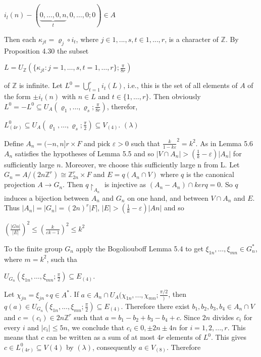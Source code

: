 \documentclass[12pt]{article}
\begin{document}
    $i_l (n) - (\underbrace{0, \dots, 0, n}_t, 0, \dots, 0; 0) \in A$


    Then each $κ_{jt} = \varrho_j \circ i_t$, where $j \in {1, . . . , s}, t \in {1, . . . , r}$, is a character of $\mathbb{Z}$. By Proposition 4.30 the subset


    $L = U_{\mathbb{Z}} (\{\kappa_{jt} : j = 1, \dots, s, t=1, \dots, r\}; \frac{\pi}{8r})$


of $\mathbb{Z}$ is infinite. Let $L^0 = \bigcup^r_{t=1} i_t (L)$, i.e., this is the set of all elements of $A$ of the form $\pm i_t (n)$ with $n \in L$ and 
$t \in \{1, \dots, r\}$. Then obviously $L^0 = -L^0 \subseteq U_A (\varrho_1, \dots, \varrho_s; \frac{\pi}{8r})$, therefor,


    $L^0_{(4r)} \subseteq U_A (\varrho_1, \dots, \varrho_s; \frac{\pi}{2}) \subseteq V_{(4)}$.  $(\lambda)$


    
    Define $A_n = (-n, n]r \times F$ and pick $\varepsilon > 0$ such that $\frac{k}{1-k\varepsilon}^2= k^2$. As in Lemma 5.6 $A_n$ satisfies the
hypotheses of Lemma 5.5 and so $|V \cap A_n| > (\frac{1}{k} - \varepsilon)|A_n|$ for sufficiently large $n$. Moreover, we choose this
sufficiently large n from L. Let $G_n = A/(2n \mathbb{Z}^r) \cong \mathbb{Z}^r_{2n} \times F$ and $E = q(A_n \cap V )$ where $q$ is the canonical
projection $A \to G_n$. Then $q \upharpoonright_{A_n}$ is injective as $(A_n - A_n) \cap ker q = 0$. So $q$ induces a bijection between $A_n$ and
$G_n$ on one hand, and between $V \cap A_n$ and $E$. Thus $|A_n| = |G_n| = (2n)^r |F|$, $|E| > (\frac{1}{k} - \varepsilon)|An|$ and so


    $(\frac{|Gn|}{|E|})^2 \leq (\frac{k}{\varepsilon k - 1})^2 \leq k^2$


    
    To the finite group $G_n$ apply the Bogoliouboff Lemma 5.4 to get $\xi_{1n}, \dots , \xi_{mn} \in G^*_n$, where $m = k^2$, such tha


    $U_{G_n} (\xi_{1n}, \dots, \xi_{mn}; \frac{\pi}{2}) \subseteq E_{(4)}$.

    
Let $\chi_{jn} = \xi_{jn} \circ q \in A^*$. If $a \in A_n \cap U_A(\chi_{1n}, . . . , \chi_{mn}; \frac{\pi/2})$, then $q(a) \in U_{G_n}(\xi_{1n}, . . . , \xi_{mn}; \frac{\pi}{2}) \subseteq E_{(4)}$. Therefore
there exist $b_1, b_2, b_3, b_4 \in A_n \cap V$ and $c = (c_i) \in 2n\mathbb{Z}^r$ such that $a = b_1 - b_2 + b_3 - b_4 + c$. Since $2n$ divides $c_i$ for
every $i$ and $|c_i| \leq 5n$, we conclude that $c_i \in {0, \pm 2n \pm 4n}$ for $i = 1, 2, . . . , r$. This means that $c$ can be written
as a sum of at most $4r$ elements of $L^0$. This gives $c ∈ L^0_{(4r)} \subseteq V(4)$ by $(\lambda)$, consequently $a \in V_{(8)}$. Therefore
\end{document}
